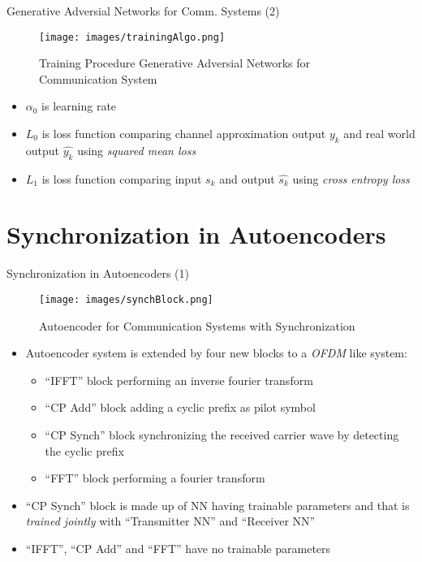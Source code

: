 \documentclass[xcolor=table,mathserif,9pt]{beamer}    %
\begin{document}
\begin{frame}{Generative Adversial Networks for Comm. Systems (2)}

\begin{figure}[htpb]
	\centering
	\texttt{[image: images/trainingAlgo.png]}
	\caption{Training Procedure Generative Adversial Networks for Communication System}
\end{figure}

\begin{itemize}
	\item $\alpha_0$ is learning rate
	\item $L_0$ is loss function comparing 
		channel approximation output $y_k$ and real world output $\hat{y_k}$ using \emph{squared mean loss}
	\item $L_1$ is loss function comparing input $s_k$ and output $\hat{s_k}$ using \emph{cross entropy loss}
\end{itemize}

\end{frame}

\section{Synchronization in Autoencoders}
\begin{frame}{Synchronization in Autoencoders (1)}

\begin{figure}[htpb]
	\centering
	\texttt{[image: images/synchBlock.png]}
	\caption{Autoencoder for Communication Systems with Synchronization \cite{synch1}} 
\end{figure}

\begin{itemize}
	\item Autoencoder system is extended by four new blocks to a \emph{OFDM} like system:
		\begin{itemize}
			\item ``IFFT'' block performing an inverse fourier transform
			\item ``CP Add'' block adding a cyclic prefix as pilot symbol
			\item ``CP Synch'' block synchronizing the received carrier wave by detecting the cyclic prefix
			\item ``FFT'' block performing a fourier transform
		\end{itemize}
	\item ``CP Synch'' block is made up of NN having trainable parameters and that is \emph{trained jointly} with ``Transmitter NN'' and ``Receiver NN''
	\item ``IFFT'', ``CP Add'' and ``FFT'' have no trainable parameters 
\end{itemize}

\end{frame}
\end{document}
